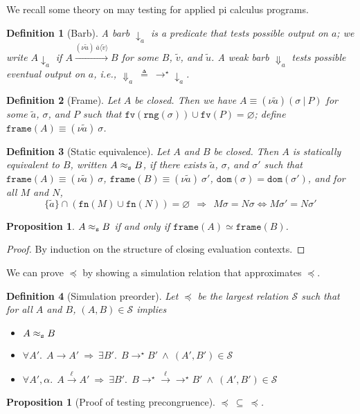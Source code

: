\documentclass[10pt]{article}
\newtheorem{definition}{Definition}
\newtheorem{proposition}[theorem]{Proposition}
\newcommand{\tup}[1]{\langle #1\rangle}
\newcommand{\new}[2]{(\nu #1)\:#2}
\newcommand{\action}[1]{\stackrel{#1}{\longrightarrow}}
\newcommand{\fn}{\mathtt{fn}}
\newcommand{\fv}{\mathtt{fv}}
\newcommand{\dom}{\mathtt{dom}}
\newcommand{\seq}{\widetilde}
\begin{document}
We recall some theory on may testing for applied pi calculus programs.
\begin{definition}[Barb] A barb $\downarrow_a$ is a predicate that tests possible output on $a$; we write $A \downarrow_a$ if $A \action{\new{\seq u}\overline a\tup{\seq v}} B$ for some $B$, $\seq v$, and $\seq u$. A weak barb $\Downarrow_a$ tests possible eventual output on $a$, \emph{i.e.}, $\Downarrow_a \:\triangleq\: \rightarrow^\star\downarrow_a$.
\end{definition}
\noindent
\begin{definition}[Frame]
Let $A$ be closed. Then we have $A \equiv (\nu\seq a)(\sigma ~|~P)$ for some $\seq a$, $\sigma$, and $P$ such that $\fv(\mathtt{rng}(\sigma)) \cup \fv(P) = \varnothing$; define $\mathtt{frame}(A) \equiv \new{\seq a}\sigma$.
\end{definition}
\begin{definition}[Static equivalence] Let $A$ and $B$ be closed. Then $A$ is statically equivalent to $B$, written $A \approx_{\tt s} B$, if there exists $\seq a$, $\sigma$, and $\sigma'$ such that $\mathtt{frame}(A) \equiv \new{\seq a}\sigma$, $\mathtt{frame}(B) \equiv \new{\seq a}\sigma'$, $\dom(\sigma) = \dom(\sigma')$, and for all $M$ and $N$,
$$\{\seq a\} \cap (\fn(M) \cup \fn(N)) = \varnothing ~~\Rightarrow~~ M\sigma = N\sigma \Leftrightarrow M\sigma' = N\sigma'$$
\end{definition}
\begin{proposition} $A \approx_{\tt s} B$ if and only if $\mathtt{frame}(A) \simeq \mathtt{frame}(B)$.
\end{proposition}
\begin{proof} By induction on the structure of closing evaluation contexts.
\end{proof}

We can prove $\preceq$ by showing a simulation relation that approximates $\preceq$.
\begin{definition}[Simulation preorder]
Let $\preccurlyeq$ be the largest relation $\mathcal S$ such that for all $A$ and $B$, $(A,B) \in \mathcal S$ implies
\begin{itemize}
\item $A \approx_{\tt s} B$
\item $\forall A'.~~A \rightarrow A' ~\Rightarrow~ \exists B'.~~B \rightarrow^\star B' ~\wedge~ (A',B') \in \mathcal S$
\item $\forall A',\alpha.~~A \action\ell A' ~\Rightarrow~ \exists B'.~~B \rightarrow^\star\action\ell\rightarrow^\star B' ~\wedge~ (A',B') \in \mathcal S$
\end{itemize}
\end{definition}
\begin{proposition}[Proof of testing precongruence]\label{pf-prec} $\preccurlyeq \:\subseteq\: \preceq$. 
\end{proposition}
\end{document}
